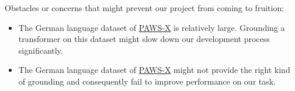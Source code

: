\documentclass[11pt]{article}
\begin{document}
Obstacles or concerns that might prevent our project from coming to fruition:
\begin{itemize}
    \item The German language dataset of \href{https://github.com/google-research-datasets/paws}{PAWS-X} is relatively large. Grounding a transformer on this dataset might slow down our development process significantly.
    \item The German language dataset of \href{https://github.com/google-research-datasets/paws}{PAWS-X} might not provide the right kind of grounding and consequently fail to improve performance on our task.
\end{itemize}


\end{document}
